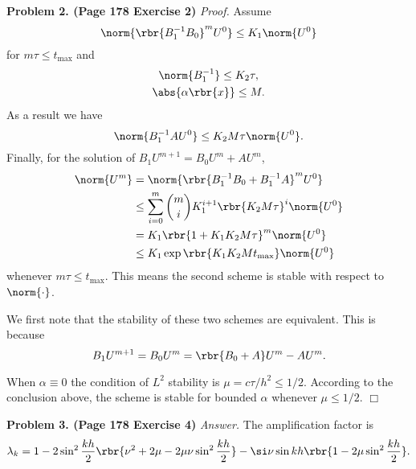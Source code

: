 \documentclass[english, nochinese]{pnote}
\begin{document}
\textbf{Problem 2. (Page 178 Exercise 2)} \textit{Proof.} Assume
\begin{equation}
\norm{ \rbr{ B_1^{-1} B_0 }^m U^0 } \le K_1 \norm{U^0}
\end{equation}
for $ m \tau \le t_{\text{max}} $ and
\begin{gather}
\norm{B_1^{-1}} \le K_2 \tau, \\
\abs{ \alpha \rbr{x} } \le M.
\end{gather}
As a result we have
\begin{equation}
\norm{ B_1^{-1} A U^0 } \le K_2 M \tau \norm{U^0}.
\end{equation}
Finally, for the solution of $ B_1 U^{ m + 1 } = B_0 U^m + A U^m $, 
\begin{equation}
\begin{split}
\norm{U^m} &= \norm{ \rbr{ B_1^{-1} B_0 + B_1^{-1} A }^m U^0 } \\
&\le \sum_{ i = 0 }^m \binom{m}{i} K_1^{ i + 1 } \rbr{ K_2 M \tau }^i \norm{U^0} \\
&= K_1 \rbr{ 1 + K_1 K_2 M \tau }^m \norm{U^0} \\
&\le K_1 \exp \rbr{ K_1 K_2 M t_{\text{max}} } \norm{U^0}
\end{split}
\end{equation}
whenever $ m \tau \le t_{\text{max}} $. This means the second scheme is stable with respect to $\norm{\cdot}$.

We first note that the stability of these two schemes are equivalent. This is because
\begin{equation}
B_1 U^{ m + 1 } = B_0 U^m = \rbr{ B_0 + A } U^m - A U^m.
\end{equation}

When $ \alpha \equiv 0 $ the condition of $L^2$ stability is $ \mu = c \tau / h^2 \le 1 / 2 $. According to the conclusion above, the scheme is stable for bounded $\alpha$ whenever $ \mu \le 1 / 2 $.
\hfill$\Box$

\textbf{Problem 3. (Page 178 Exercise 4)} \textit{Answer.} The amplification factor is
\begin{equation}
\lambda_k = 1 - 2 \sin^2 \frac{ k h }{2} \rbr{ \nu^2 + 2 \mu - 2 \mu \nu \sin^2 \frac{ k h }{2} } - \si \nu \sin k h \rbr{ 1 - 2 \mu \sin^2 \frac{ k h }{2} }.
\end{equation}
\end{document}
